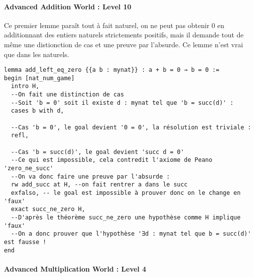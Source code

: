 \paragraph{Advanced Addition World : Level 10}

Ce premier lemme paraît tout à fait naturel, on ne peut pas obtenir 0 en additionnant des entiers naturels strictements positifs, mais il demande tout de même une distionction de cas et une preuve par l'absurde. 
Ce lemme n'est vrai que dans les naturels.

\begin{verbatim}
lemma add_left_eq_zero {{a b : mynat}} : a + b = 0 → b = 0 :=
begin [nat_num_game]
  intro H,
  --On fait une distinction de cas
  --Soit 'b = 0' soit il existe d : mynat tel que 'b = succ(d)' :
  cases b with d,

  --Cas 'b = 0', le goal devient '0 = 0', la résolution est triviale :
  refl,

  --Cas 'b = succ(d)', le goal devient 'succ d = 0'
  --Ce qui est impossible, cela contredit l'axiome de Peano 'zero_ne_succ'
  --On va donc faire une preuve par l'absurde :
  rw add_succ at H, --on fait rentrer a dans le succ 
  exfalso, -- le goal est impossible à prouver donc on le change en 'faux'
  exact succ_ne_zero H,
  --D'après le théorème succ_ne_zero une hypothèse comme H implique 'faux'
  --On a donc prouver que l'hypothèse '∃d : mynat tel que b = succ(d)' est fausse !
end
\end{verbatim}

\paragraph{Advanced Multiplication World : Level 4}

